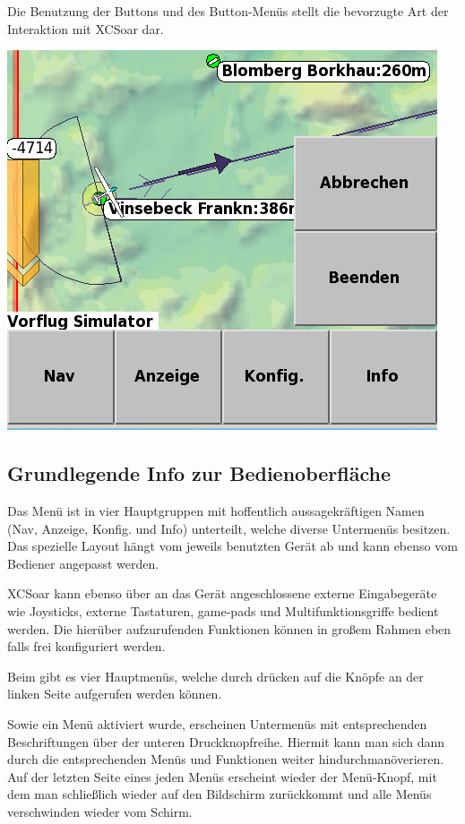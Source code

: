 Die Benutzung der Buttons und des Button-Menüs  stellt die bevorzugte Art der Interaktion mit \textsf{XCSoar} dar.

\begin{center}
\includegraphics[angle=0,width=\linewidth,keepaspectratio='true']{figures/buttonmenu.png}
\end{center}

\subsection*{Grundlegende Info zur Bedienoberfläche}
Das Menü ist in vier Hauptgruppen mit hoffentlich aussagekräftigen Namen (Nav, Anzeige, Konfig. und Info) unterteilt, welche diverse Untermenüs besitzen. Das spezielle Layout hängt vom jeweils benutzten Gerät ab und kann ebenso vom Bediener angepasst werden.

 \textsf{XCSoar} kann ebenso über an das Gerät angeschlossene externe Eingabegeräte wie Joysticks, externe Tastaturen, game-pads und Multifunktionsgriffe bedient werden. Die hierüber aufzurufenden Funktionen können in großem Rahmen eben falls frei konfiguriert  werden.


Beim  \al  gibt es vier Hauptmenüs, welche durch drücken auf die Knöpfe an der linken Seite aufgerufen werden können. 

Sowie ein Menü aktiviert wurde, erscheinen Untermenüs mit entsprechenden Beschriftungen über der unteren Druckknopfreihe. 
Hiermit kann man sich dann durch die entsprechenden Menüs und Funktionen weiter hindurchmanöverieren. 
Auf der letzten Seite eines jeden Menüs erscheint wieder der Menü-Knopf, mit dem man schließlich wieder auf den 
Bildschirm zurückkommt und alle Menüs verschwinden wieder vom Schirm. 
 


